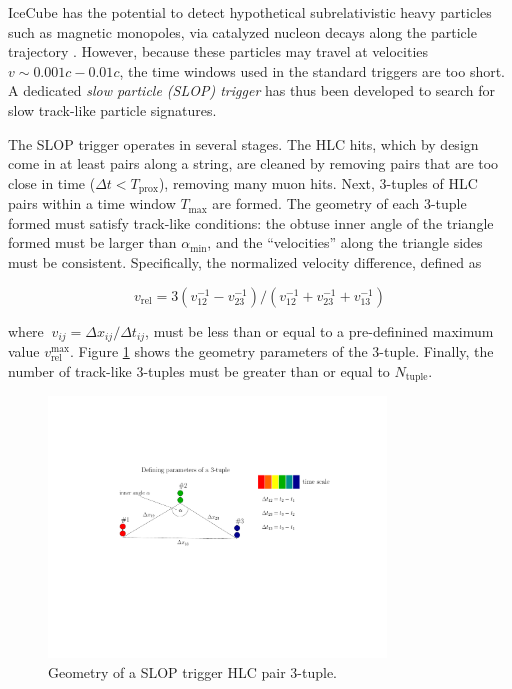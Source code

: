 IceCube has the potential to detect hypothetical subrelativistic heavy
particles such as magnetic monopoles, via catalyzed nucleon decays along
the particle trajectory \cite{IC3:monopole}.  However, because these
particles may travel at velocities $v \sim 0.001c - 0.01c$, the
time windows used in the standard triggers are too short.  A
dedicated \emph{slow particle (SLOP) trigger} has thus been developed to 
search for slow track-like particle signatures.

The SLOP trigger operates in several stages.  The HLC hits, which by
design come in at least pairs along a string, are cleaned by removing pairs
that are too close in time ($\Delta t < T_{\mathrm{prox}}$), removing
many muon hits.  Next, 3-tuples of HLC pairs within a time window
$T_{\mathrm{max}}$ are formed.  The geometry of each
3-tuple formed must satisfy track-like conditions: the obtuse inner angle
of the triangle formed must be larger than $\alpha_{\mathrm{min}}$, and the
``velocities'' along the triangle sides must be consistent.  Specifically,
the normalized velocity difference, defined as

\begin{equation}
  v_{\mathrm{rel}} =
  3(v^{-1}_{12} - v^{-1}_{23})/(v^{-1}_{12} + v^{-1}_{23} +
  v^{-1}_{13})
\end{equation}

\noindent where $\ v_{ij} = \Delta x_{ij}/\Delta t_{ij}$, must be less than
or equal to a pre-definined maximum value
$v_{\mathrm{rel}}^{\mathrm{max}}$.  Figure \ref{fig:slop} 
shows the geometry parameters of the 3-tuple.  Finally, the number of track-like
3-tuples must be greater than or equal to $N_{\mathrm{tuple}}$.  

\begin{figure}[!h]
 \centering
 \includegraphics[width=0.8\textwidth]{graphics/online/trigger/slop.pdf}
 \caption{Geometry of a SLOP trigger HLC pair 3-tuple.}
 \label{fig:slop}
\end{figure}

